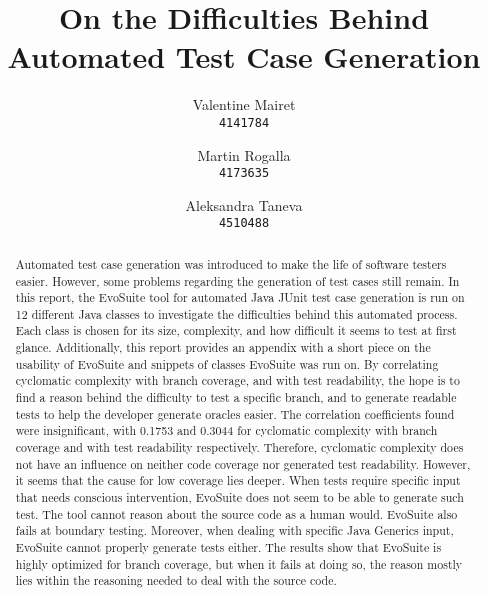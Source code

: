 \documentclass[a4paper]{article}
\title{%
On the Difficulties Behind Automated Test Case Generation 
}
\author{%
\small Valentine Mairet \\
\texttt{4141784}
\and
\small Martin Rogalla \\
\texttt{4173635}
\and
\small Aleksandra Taneva \\
\texttt{4510488}
}
\begin{document}
\maketitle

\vfill 

\begin{abstract}
\noindent
Automated test case generation was introduced to make the life of software testers easier. 
However, some problems regarding the generation of test cases still remain. 
In this report, the EvoSuite tool for automated Java JUnit test case generation is run on 12 different Java classes to investigate the difficulties behind this automated process. 
Each class is chosen for its size, complexity, and how difficult it seems to test at first glance.
Additionally, this report provides an appendix with a short piece on the usability of EvoSuite and snippets of classes EvoSuite was run on. 
By correlating cyclomatic complexity with branch coverage, and with test readability, the hope is to find a reason behind the difficulty to test a specific branch, and to generate readable tests to help the developer generate oracles easier. 
The correlation coefficients found were insignificant, with 0.1753 and 0.3044 for cyclomatic complexity with branch coverage and with test readability respectively. 
Therefore, cyclomatic complexity does not have an influence on neither code coverage nor generated test readability.
However, it seems that the cause for low coverage lies deeper.
When tests require specific input that needs conscious intervention, EvoSuite does not seem to be able to generate such test. 
The tool cannot reason about the source code as a human would.
EvoSuite also fails at boundary testing. 
Moreover, when dealing with specific Java Generics input, EvoSuite cannot properly generate tests either. 
The results show that EvoSuite is highly optimized for branch coverage, but when it fails at doing so, the reason mostly lies within the reasoning needed to deal with the source code. 
\end{abstract}
\newpage

\tableofcontents
\newpage

\setlength{\parindent}{0cm}











\newpage




\newpage

\appendix

\end{document}
